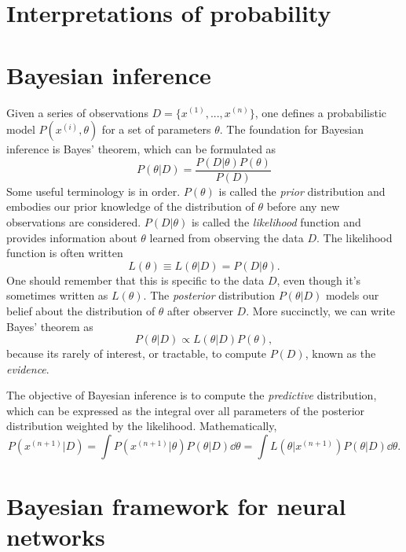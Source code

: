 \section{Interpretations of probability}


\section{Bayesian inference}
Given a series of observations $D = \{ x^{(1)}, ... , x^{(n)} \}$, one defines a probabilistic model $P(x^{(i)}, \theta)$ for a set of parameters $\theta$.  The foundation for Bayesian inference is Bayes' theorem, which can be formulated as
\begin{equation}
	P(\theta | D) = \frac{P(D|\theta)P(\theta)}{P(D)}
\end{equation}
Some useful terminology is in order. $P(\theta)$ is called the \textit{prior} distribution and embodies our prior knowledge of the distribution of $\theta$ before any new observations are considered. $P(D|\theta)$ is called the \textit{likelihood} function and provides information about $\theta$ learned from observing the data $D$. The likelihood function is often written
\begin{equation}
  L(\theta) \equiv L(\theta|D) = P(D|\theta).
\end{equation}
One should remember that this is specific to the data $D$, even though it's sometimes written as $L(\theta)$. The \textit{posterior} distribution $P(\theta|D)$ models our belief about the distribution of $\theta$ after observer $D$. More succinctly, we can write Bayes' theorem as
\begin{equation}
  P(\theta|D) \propto L(\theta|D)P(\theta),
\end{equation}
because its rarely of interest, or tractable, to compute $P(D)$, known as the \textit{evidence}.

The objective of Bayesian inference is to compute the \textit{predictive} distribution, which can be expressed as
the integral over all parameters of the posterior distribution weighted by the likelihood. Mathematically,
\begin{equation}
  P(x^{(n+1)}|D) = \int P(x^{(n+1)}|\theta)P(\theta|D)\dd \theta = \int L(\theta|x^{(n+1)})P(\theta|D)\dd \theta.
\end{equation}


\section{Bayesian framework for neural networks}

